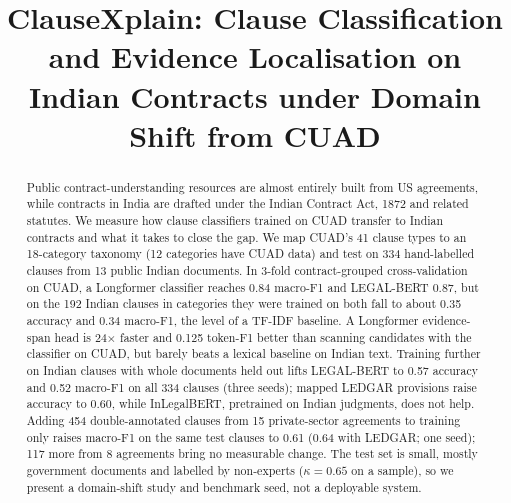 \documentclass[conference]{IEEEtran}
\begin{document}
\title{ClauseXplain: Clause Classification and Evidence Localisation on Indian Contracts under Domain Shift from CUAD}

\author{
\and
\IEEEauthorblockN{}%
}%

\maketitle

\begin{abstract}
Public contract-understanding resources are almost entirely built from US agreements, while contracts in India are drafted under the Indian Contract Act, 1872 and related statutes. We measure how clause classifiers trained on CUAD transfer to Indian contracts and what it takes to close the gap. We map CUAD's 41 clause types to an 18-category taxonomy (12 categories have CUAD data) and test on 334 hand-labelled clauses from 13 public Indian documents. In 3-fold contract-grouped cross-validation on CUAD, a Longformer classifier reaches 0.84 macro-F1 and LEGAL-BERT 0.87, but on the 192 Indian clauses in categories they were trained on both fall to about 0.35 accuracy and 0.34 macro-F1, the level of a TF-IDF baseline. A Longformer evidence-span head is 24$\times$ faster and 0.125 token-F1 better than scanning candidates with the classifier on CUAD, but barely beats a lexical baseline on Indian text. Training further on Indian clauses with whole documents held out lifts LEGAL-BERT to 0.57 accuracy and 0.52 macro-F1 on all 334 clauses (three seeds); mapped LEDGAR provisions raise accuracy to 0.60, while InLegalBERT, pretrained on Indian judgments, does not help. Adding 454 double-annotated clauses from 15 private-sector agreements to training only raises macro-F1 on the same test clauses to 0.61 (0.64 with LEDGAR; one seed); 117 more from 8 agreements bring no measurable change. The test set is small, mostly government documents and labelled by non-experts ($\kappa=0.65$ on a sample), so we present a domain-shift study and benchmark seed, not a deployable system.
\end{abstract}
\end{document}
